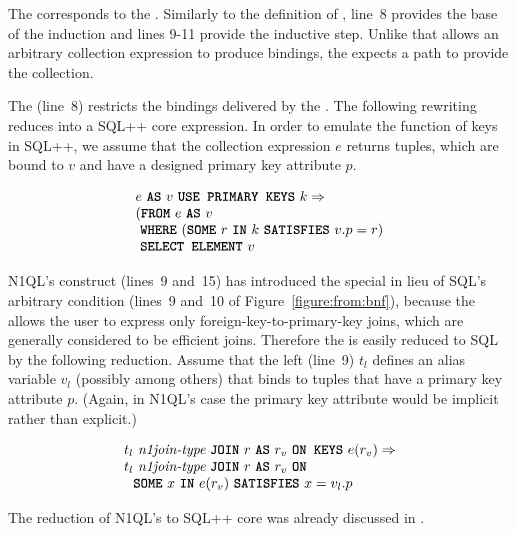 The  corresponds to the . Similarly to the definition of , line~8 provides the base of the induction and lines 9-11 provide the inductive step. Unlike  that allows an arbitrary collection expression to produce bindings, the  expects a path to provide the collection.

The  (line~8) restricts the bindings delivered by the . The following rewriting reduces  into a SQL++ core expression. In order to emulate the function of keys in SQL++, we assume that the collection expression $e$ returns tuples, which are bound to $v$ and have a designed primary key attribute $p$.

\[
\begin{array}{l}
e\ \texttt{\textbf{AS}}\ v\ \texttt{\textbf{USE PRIMARY KEYS}}\ k \Rightarrow\\
(\texttt{\textbf{FROM}}\ e\ \texttt{\textbf{AS}}\ v \\
\ \texttt{\textbf{WHERE}}\ (\texttt{\textbf{SOME}}\ r\ \texttt{\textbf{IN}}\ k\ \texttt{\textbf{SATISFIES}}\ v.p = r)\\
\ \texttt{\textbf{SELECT ELEMENT}}\ v \\
\end{array}
\]

N1QL's  construct (lines~9 and~15) has introduced the special  in lieu of SQL's arbitrary  condition (lines~9 and~10 of Figure~\ref{figure:from:bnf}), because the  allows the user to express only foreign-key-to-primary-key joins, which are generally considered to be efficient joins. Therefore the  is easily reduced to SQL by the following reduction. Assume that the left  (line~9) $t_l$ defines an alias variable $v_l$ (possibly among others) that binds to tuples that have a primary key attribute $p$. (Again, in N1QL's case the primary key attribute would be implicit rather than explicit.) 

\[
\begin{array}{l}
t_l\ \textit{n1join-type}\ \texttt{\textbf{JOIN}}\ r\ \texttt{\textbf{AS}}\ r_v\ \texttt{\textbf{ON KEYS}}\  e(r_v) \Rightarrow\\
t_l\ \textit{n1join-type}\ \texttt{\textbf{JOIN}}\ r\ \texttt{\textbf{AS}}\ r_v\ \texttt{\textbf{ON}}\\
\ \ \texttt{\textbf{SOME}}\ x\ \texttt{\textbf{IN}}\ e(r_v)\ \texttt{\textbf{SATISFIES}}\ x = v_l.p\\
\end{array}
\]


The reduction of N1QL's  to SQL++ core was already discussed in \cite{SQLpp-on-db.ucsd}.

